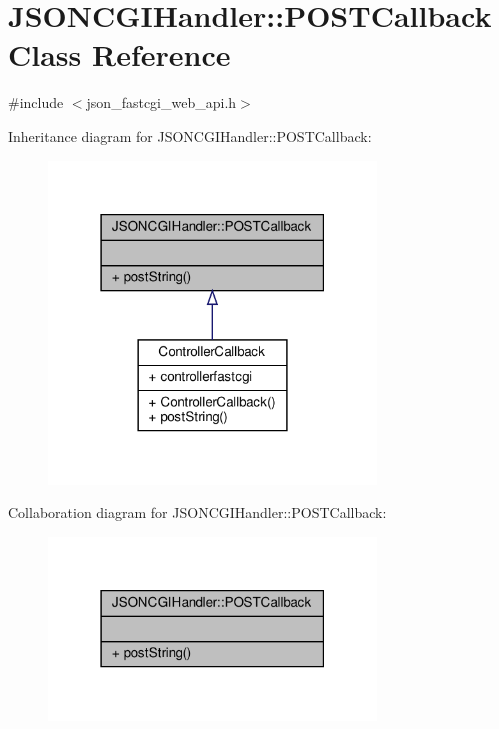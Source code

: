 \hypertarget{classJSONCGIHandler_1_1POSTCallback}{}\section{J\+S\+O\+N\+C\+G\+I\+Handler\+:\+:P\+O\+S\+T\+Callback Class Reference}
\label{classJSONCGIHandler_1_1POSTCallback}


{\ttfamily \#include $<$json\+\_\+fastcgi\+\_\+web\+\_\+api.\+h$>$}



Inheritance diagram for J\+S\+O\+N\+C\+G\+I\+Handler\+:\+:P\+O\+S\+T\+Callback\+:\nopagebreak
\begin{figure}[H]
\begin{center}
\leavevmode
\includegraphics[width=247pt]{classJSONCGIHandler_1_1POSTCallback__inherit__graph}
\end{center}
\end{figure}


Collaboration diagram for J\+S\+O\+N\+C\+G\+I\+Handler\+:\+:P\+O\+S\+T\+Callback\+:\nopagebreak
\begin{figure}[H]
\begin{center}
\leavevmode
\includegraphics[width=247pt]{classJSONCGIHandler_1_1POSTCallback__coll__graph}
\end{center}
\end{figure}
